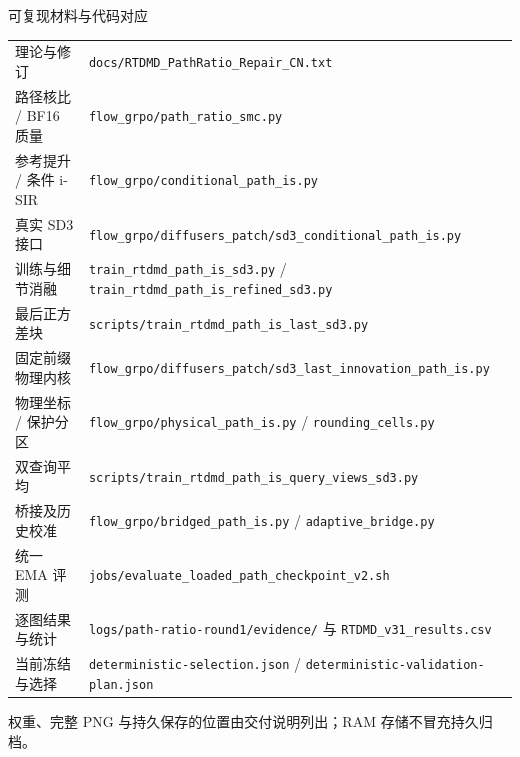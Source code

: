 \documentclass[10pt,aspectratio=169]{beamer}
\begin{document}
\begin{frame}{可复现材料与代码对应}
\footnotesize
\begin{tabularx}{\textwidth}{lX}\toprule
理论与修订 & \texttt{docs/RTDMD\_PathRatio\_Repair\_CN.txt}\\
路径核比 / BF16 质量 & \texttt{flow\_grpo/path\_ratio\_smc.py}\\
参考提升 / 条件 i-SIR & \texttt{flow\_grpo/conditional\_path\_is.py}\\
真实 SD3 接口 & \texttt{flow\_grpo/diffusers\_patch/sd3\_conditional\_path\_is.py}\\
训练与细节消融 & \texttt{train\_rtdmd\_path\_is\_sd3.py} / \texttt{train\_rtdmd\_path\_is\_refined\_sd3.py}\\
最后正方差块 & \texttt{scripts/train\_rtdmd\_path\_is\_last\_sd3.py}\\
固定前缀物理内核 & \texttt{flow\_grpo/diffusers\_patch/sd3\_last\_innovation\_path\_is.py}\\
物理坐标 / 保护分区 & \texttt{flow\_grpo/physical\_path\_is.py} / \texttt{rounding\_cells.py}\\
双查询平均 & \texttt{scripts/train\_rtdmd\_path\_is\_query\_views\_sd3.py}\\
桥接及历史校准 & \texttt{flow\_grpo/bridged\_path\_is.py} / \texttt{adaptive\_bridge.py}\\
统一 EMA 评测 & \texttt{jobs/evaluate\_loaded\_path\_checkpoint\_v2.sh}\\
逐图结果与统计 & \texttt{logs/path-ratio-round1/evidence/} 与 \texttt{RTDMD\_v31\_results.csv}\\
当前冻结与选择 & \texttt{deterministic-selection.json} / \texttt{deterministic-validation-plan.json}\\
\bottomrule\end{tabularx}
\par\vspace{4pt}权重、完整 PNG 与持久保存的位置由交付说明列出；RAM 存储不冒充持久归档。
\end{frame}
\end{document}

